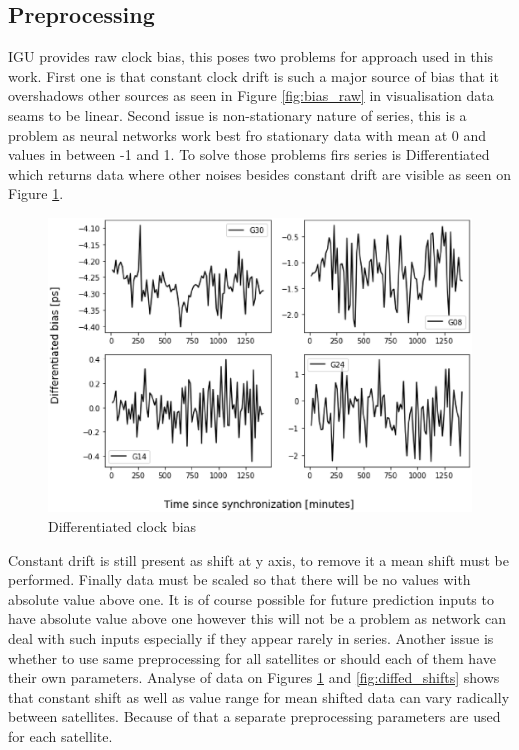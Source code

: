 \documentclass{article}
\begin{document}
\subsection{Preprocessing}
IGU provides raw clock bias, this poses two problems for approach used in this work.
First one is that constant clock drift is such a major source of bias that it overshadows other
sources as seen in Figure \ref{fig:bias_raw} in visualisation data seams to be linear.
Second issue is non-stationary nature of series, this is a problem as neural networks work best
fro stationary data with mean at 0 and values in between -1 and 1. To solve those problems firs
series is Differentiated which returns data where other noises besides constant drift are visible as
seen on Figure \ref{fig:diffed_bias}.
\begin{figure}[H] 
\centering
\includegraphics[width=\textwidth]{figures/bias_diffed}
\caption{Differentiated clock bias}
\label{fig:diffed_bias}
\end{figure}
Constant drift is still present as shift at y axis, to remove it a mean shift must be performed.
Finally data must be scaled so that there will be no values with absolute value above one. It is
of course possible for future prediction inputs to have absolute value above one however this will
not be a problem as network can deal with such inputs especially if they appear rarely in series.
Another issue is whether to use same preprocessing for all satellites or should each of them 
have their own parameters.
Analyse of data on Figures \ref{fig:diffed_bias} and \ref{fig:diffed_shifts} shows that
constant shift as well as value range for mean shifted data can vary radically between satellites.
Because of that a separate preprocessing parameters are used for each satellite.
\end{document}
